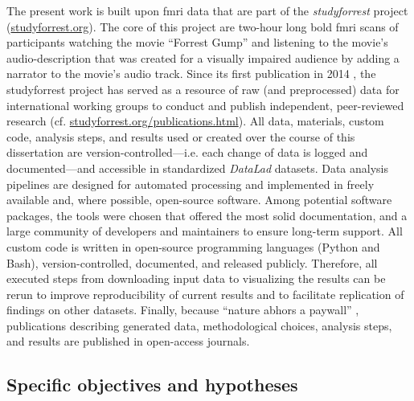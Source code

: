 %
The present work is built upon \ac{fmri} data that are part of the
\textit{studyforrest} project
(\href{www.studyforrest.org}{\url{studyforrest.org}}).
The core of this project are two-hour long \ac{bold} \ac{fmri} scans of
participants watching the movie ``Forrest Gump'' \citep{ForrestGumpMovie} and
listening to the movie's audio-description that was created for a visually
impaired audience by adding a narrator to the movie's audio track.
Since its first publication in 2014 \citep{hanke2014audiomovie}, the
studyforrest project has served as a resource of raw (and preprocessed) data for
international working groups to conduct and publish independent, peer-reviewed
research (cf.
\href{www.studyforrest.org/publications.html}{\url{studyforrest.org/publications.html}}).
All data, materials, custom code, analysis steps, and results used or created
over the course of this dissertation are version-controlled---i.e. each change
of data is logged and documented---and accessible in standardized
\textit{DataLad}
\citep[\href{www.datalad.org}{\url{datalad.org}};][]{halchenko2021datalad}
datasets.
Data analysis pipelines are designed for automated processing and implemented in
freely available and, where possible, open-source software.
Among potential software packages, the tools were chosen that offered the most
solid documentation, and a large community of developers and maintainers to
ensure long-term support.
All custom code is written in open-source programming languages (Python and
Bash), version-controlled, documented, and released publicly.
Therefore, all executed steps from downloading input data to visualizing the
results can be rerun to improve reproducibility of current results and to
facilitate replication of findings on other datasets.
Finally, because ``nature abhors a paywall'' \citep{dupre2020nature},
publications describing generated data, methodological choices, analysis steps,
and results are published in open-access journals.



\subsection{Specific objectives and hypotheses}

